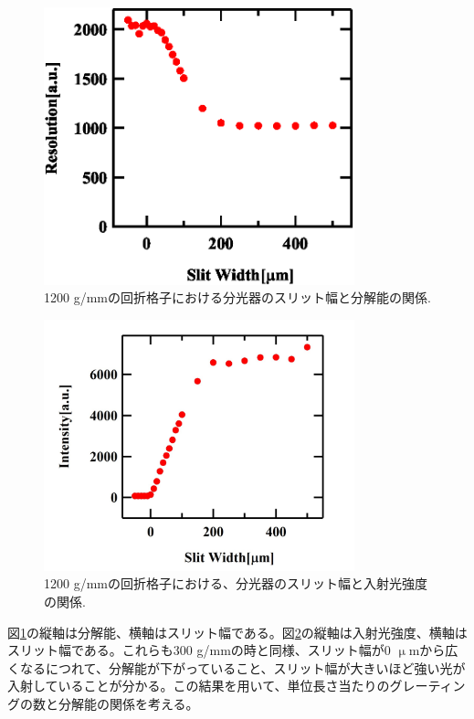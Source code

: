 \documentclass[11pt,a4j]{jsarticle}
\begin{document}
\begin{enumerate}
       \begin{figure}[t]
        \centering
        \includegraphics[clip,width=9cm]{start1_1200Resolution.eps}
        \caption{1200 g/mmの回折格子における分光器のスリット幅と分解能の関係.}
        \label{fig_1200_resolution1}
       \end{figure}

       \newpage

       \begin{figure}[ht]
        \centering
        \includegraphics[clip,width=9cm]{start1_1200Intensity.jpg}
        \caption{1200 g/mmの回折格子における、分光器のスリット幅と入射光強度の関係.}
        \label{fig_1200_Int1}
       \end{figure}

       図\ref{fig_1200_resolution1}の縦軸は分解能、横軸はスリット幅である。図\ref{fig_1200_Int1}の縦軸は入射光強度、横軸はスリット幅である。これらも300 g/mmの時と同様、スリット幅が0 $\upmu$mから広くなるにつれて、分解能が下がっていること、スリット幅が大きいほど強い光が入射していることが分かる。この結果を用いて、単位長さ当たりのグレーティングの数と分解能の関係を考える。


\end{enumerate}
\end{document}
